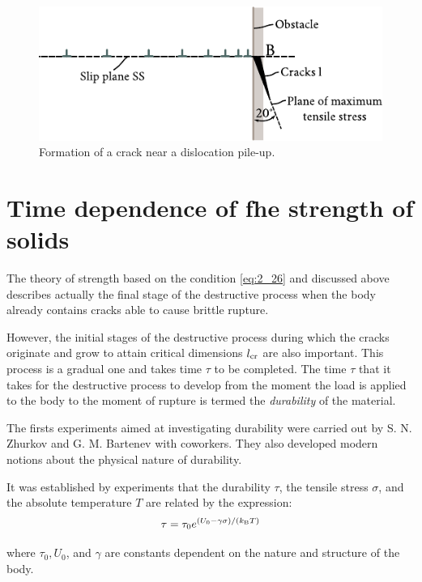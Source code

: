 \begin{figure}[t]
	\begin{center}
		\includegraphics[scale=1.0]{figures/ch_02/fig_2_28.pdf}
		\caption[]{Formation of a crack near a dislocation pile-up.}
		\label{fig:2_28}
	\end{center}
	\vspace{-0.7cm}
\end{figure}

\section{Time dependence of fhe strength of solids}\label{sec:21}

The theory of strength based on the condition \eqref{eq:2_26} and discussed above describes actually the final stage of the destructive process when the body already contains cracks able to cause brittle rupture.

However, the initial stages of the destructive process during which the cracks originate and grow to attain critical dimensions $l_{\text{cr}}$ are also important. This process is a gradual one and takes time $\tau$ to be completed. The time $\tau$ that it takes for the destructive process to develop from the moment the load is applied to the body to the moment
of rupture is termed the \textit{durability} of the material.

The firsts experiments aimed at investigating durability were carried out by S. N. Zhurkov and G. M. Bartenev with coworkers. They also developed modern notions about the physical nature of durability.

It was established by experiments that the durability $\tau$, the tensile stress $\sigma$, and the absolute temperature $T$ are related by the expression:
\begin{equation}\label{eq:2_27}
	\tau = \tau_0 e^{(U_0 - \gamma\sigma)/(k_{\text{B}} T)}
\end{equation}

\noindent
where $\tau_0, U_0$, and $\gamma$ are constants dependent on the nature and structure of the body.

